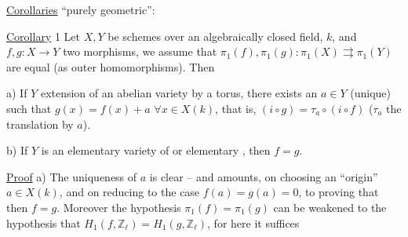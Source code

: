 \uline{Corollaries} ``purely geometric'':

\uline{Corollary} 1 Let $X,Y$ be  schemes over an algebraically closed field, $k$, and $f,g:X\longrightarrow Y$ two morphisms, we assume that $\pi_1(f),\pi_1(g):\pi_1(X)\rightrightarrows\pi_1(Y)$ are equal (as outer homomorphisms). Then

a) If $Y$   extension of an abelian variety by a torus, there exists an $a\in Y$ (unique) such that $g(x)=f(x)+a$ $\forall x\in X(k)$, that is, $(i\circ g)=\tau_a\circ(i\circ f)$ ($\tau_a$ the translation by $a$).

b) If $Y$ is an elementary variety of  or   elementary ,  then $f=g$.


\uline{Proof} a) The uniqueness of $a$ is clear -- and   amounts,  on choosing an ``origin'' $a\in X(k)$, and on reducing to the case $f(a)=g(a)=0$, to proving that then $f=g$. Moreover the hypothesis $\pi_1(f)=\pi_1(g)$ can be weakened to the hypothesis that  $H_1(f,\mathbb Z_\ell)=H_1(g,\mathbb Z_\ell)$,  for here it suffices
